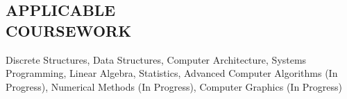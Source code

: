 \documentclass[margin]{res}
\begin{document}
\begin{resume}
\section{APPLICABLE \\ COURSEWORK}             
Discrete Structures, Data Structures, Computer Architecture, Systems Programming, Linear Algebra, Statistics, Advanced Computer Algorithms (In Progress), Numerical Methods (In Progress), Computer Graphics (In Progress)

\end{resume}
\end{document}

